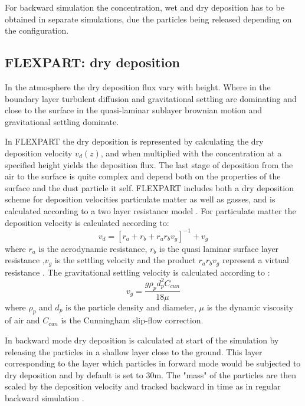 For backward simulation the concentration, wet and dry deposition has to be obtained in separate simulations, due  the particles being released depending on the configuration.  
\subsection{FLEXPART: dry deposition}
In the atmosphere the dry deposition flux vary with height. Where in the boundary layer turbulent diffusion and gravitational settling are dominating and close to the surface in the quasi-laminar sublayer brownian motion and gravitational settling dominate. 

In FLEXPART the dry deposition is represented by calculating the dry deposition velocity $v_d(z)$, and when multiplied with the concentration at a specified height yields the deposition flux. The last stage of deposition from the air to the surface is quite complex and depend both on the properties of the surface and the dust particle it self. 
FLEXPART includes both a dry deposition scheme for deposition velocities particulate matter as well as gasses, and is calculated according to a two layer resistance model \parencite{Flexpart-2005_ref_paper}. For particulate matter the deposition velocity is calculated according to:
\begin{equation}
    v_d=[r_a + r_b + r_a r_b v_g]^{-1} + v_g
\end{equation}
where $r_a$ is the aerodynamic resistance, $r_b$ is the quasi laminar surface layer resistance ,$v_g$ is the settling velocity and the product $r_a r_b v_g$ represent a virtual resistance \parencite{GIARDINA201811_drydepo}. The gravitational settling velocity is calculated according to \textcite{slinn1982predictions}:
\begin{equation}
    v_g = \frac{g\rho_p d_p^2 C_{cun}}{18\mu}
\end{equation}
where $\rho_p$ and $d_p$ is the particle density and diameter, $\mu$ is the dynamic viscosity of air and $C_{cun}$ is the Cunningham slip-flow correction.

In backward mode dry deposition is calculated at start of the simulation by releasing the particles in a shallow layer close to the ground. This layer corresponding to the layer which particles in forward mode would be subjected to dry deposition and by default is set to 30m. The "mass" of the particles are then scaled by the deposition velocity and tracked backward in time as in regular backward simulation \parencite{eckhardt2017source}. 

